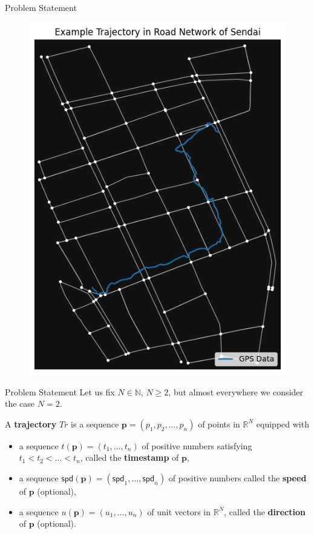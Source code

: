 \documentclass[aspectratio=169, bigfiles]{beamer}
\newcommand{\R}{\mathbb{R}}
\newcommand{\spd}{\mathsf{spd}}
\begin{document}
\begin{frame}{Problem Statement}
\vspace{-.2cm}
\begin{figure}
    \centering
    \includegraphics[scale=.43]{trajectoryandroads.png}
    \label{fig:my_label}
\end{figure}
\end{frame}




\begin{frame}{Problem Statement}
Let us fix $N\in\mathbb{N}$, $N\geq2$, but almost everywhere we consider the case $N = 2$.
\begin{definition}[Trajectory] \label{Tr}
A \textbf{trajectory} $Tr$ is a sequence $\mathbf{p} = (p_1,p_2,\dots, p_n)$ of points in $\R^N$ equipped with
\begin{itemize}
    \item a sequence $t(\mathbf{p}) = (t_1,\dots,t_{n})$ of positive numbers satisfying $t_1<t_2<\dots <t_n$, called the \textbf{timestamp} of $\mathbf{p}$,
    \item a sequence ${\spd}(\mathbf{p}) = ({\spd}_1,\dots,{\spd}_{n})$ of positive numbers called the \textbf{speed} of $\mathbf{p}$ (optional),
    \item a sequence $u(\mathbf{p}) = (u_1, \dots, u_n)$ of unit vectors in $\R^{N}$, called the \textbf{direction} of $\mathbf{p}$ (optional).
\end{itemize}
\end{definition}
\end{frame}
\end{document}
